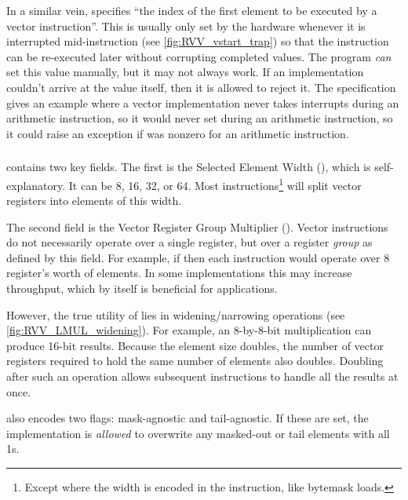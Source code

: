 In a similar vein,  specifies \enquote{the index of the first element to be executed by a vector instruction}.
This is usually only set by the hardware whenever it is interrupted mid-instruction (see \cref{fig:RVV_vstart_trap}) so that the instruction can be re-executed later without corrupting completed values.
The program \emph{can} set this value manually, but it may not always work.
If an implementation couldn't arrive at the value itself, then it is allowed to reject it.
The specification gives an example where a vector implementation never takes interrupts during an arithmetic instruction, so it would never set  during an arithmetic instruction, so it could raise an exception if  was nonzero for an arithmetic instruction.


\subsubsection{}
 contains two key fields.
The first is the Selected Element Width (), which is self-explanatory.
It can be 8, 16, 32, or 64.
Most instructions\footnote{Except where the width is encoded in the instruction, like bytemask loads.} will split vector registers into elements of this width.

The second field is the Vector Register Group Multiplier ().
Vector instructions do not necessarily operate over a single register, but over a register \emph{group} as defined by this field.
For example, if  then each instruction would operate over 8 register's worth of elements.
In some implementations this may increase throughput, which by itself is beneficial for applications.


However, the true utility of  lies in widening/narrowing operations (see \cref{fig:RVV_LMUL_widening}).
For example, an 8-by-8-bit multiplication can produce 16-bit results.
Because the element size doubles, the number of vector registers required to hold the same number of elements also doubles.
Doubling  after such an operation allows subsequent instructions to handle all the results at once.

 also encodes two flags: mask-agnostic and tail-agnostic.
If these are set, the implementation is \emph{allowed} to overwrite any masked-out or tail elements with all 1s.

